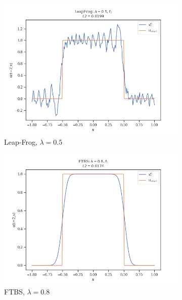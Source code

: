 \begin{figure}
\begin{subfigure}{0.3\linewidth}
        \centering
        \includegraphics[width=\linewidth]{figures/LeapFrog/LeapFrog_lambda=0.5,f1}
        \caption{Leap-Frog, $\lambda =0.5$}
    \end{subfigure}
    \hfill
    \vspace{1cm}
    \begin{subfigure}{0.3\linewidth}
        \centering
        \includegraphics[width=\linewidth]{figures/FTBS/FTBS_lambda=0.8,f1}
        \caption{FTBS, $\lambda = 0.8$}
    \end{subfigure}
    \hfill
    \begin{subfigure}{0.3\linewidth}
        \centering

\end{subfigure}
\end{figure}

